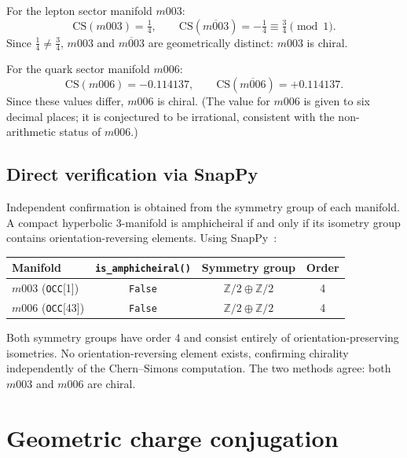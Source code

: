 \documentclass[12pt]{article}
\theoremstyle{definition}
\begin{document}
For the lepton sector manifold $m003$:
\begin{equation}
  \mathrm{CS}(m003) = \tfrac{1}{4}, \qquad
  \mathrm{CS}(\overline{m003}) = -\tfrac{1}{4} \equiv \tfrac{3}{4}
  \pmod{1}.
  \label{eq:cs_m003}
\end{equation}
Since $\tfrac{1}{4} \neq \tfrac{3}{4}$, $m003$ and $\overline{m003}$
are geometrically distinct: $m003$ is chiral.

For the quark sector manifold $m006$:
\begin{equation}
  \mathrm{CS}(m006) = -0.114137, \qquad
  \mathrm{CS}(\overline{m006}) = +0.114137.
  \label{eq:cs_m006}
\end{equation}
Since these values differ, $m006$ is chiral.
(The value for $m006$ is given to six decimal places; it is conjectured
to be irrational, consistent with the non-arithmetic status of $m006$.)

\subsection{Direct verification via SnapPy}

Independent confirmation is obtained from the symmetry group of each
manifold. A compact hyperbolic 3-manifold is amphicheiral if and only
if its isometry group contains orientation-reversing elements. Using
SnapPy~\cite{SnapPy}:

\begin{center}
\begin{tabular}{lccc}
\toprule
Manifold & \texttt{is\_amphicheiral()} & Symmetry group & Order \\
\midrule
$m003$ (\texttt{OCC}[1]) & \texttt{False} &
  $\mathbb{Z}/2\oplus\mathbb{Z}/2$ & 4 \\
$m006$ (\texttt{OCC}[43]) & \texttt{False} &
  $\mathbb{Z}/2\oplus\mathbb{Z}/2$ & 4 \\
\bottomrule
\end{tabular}
\end{center}

Both symmetry groups have order 4 and consist entirely of
orientation-preserving isometries. No orientation-reversing element
exists, confirming chirality independently of the Chern--Simons
computation. The two methods agree: both $m003$ and $m006$ are chiral.

\section{Geometric charge conjugation}
\label{sec:conj}
\end{document}
